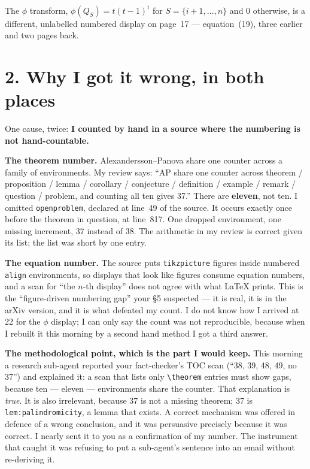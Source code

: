 \documentclass[11pt,a4paper]{article}
\begin{document}
The $\phi$ transform, $\phi(Q_S) = t(t-1)^i$ for $S=\{i+1,\dots,n\}$ and $0$ otherwise,
is a different, unlabelled numbered display on page~17 --- equation~(19), three earlier
and two pages back.

\section*{2. Why I got it wrong, in both places}

One cause, twice: \textbf{I counted by hand in a source where the numbering is not
hand-countable.}

\textbf{The theorem number.} Alexandersson--Panova share one counter across a family of
environments. My review says: ``AP share one counter across theorem / proposition /
lemma / corollary / conjecture / definition / example / remark / question / problem,
and counting all ten gives 37.'' There are \textbf{eleven}, not ten. I omitted
\texttt{openproblem}, declared at line~49 of the source. It occurs exactly once before
the theorem in question, at line~817. One dropped environment, one missing increment,
37 instead of 38. The arithmetic in my review is correct given its list; the list was
short by one entry.

\textbf{The equation number.} The source puts \texttt{tikzpicture} figures inside
numbered \texttt{align} environments, so displays that look like figures consume
equation numbers, and a scan for ``the $n$-th display'' does not agree with what
\LaTeX{} prints. This is the ``figure-driven numbering gap'' your \S5 suspected --- it is
real, it is in the arXiv version, and it is what defeated my count. I do not know how
I arrived at 22 for the $\phi$ display; I can only say the count was not reproducible,
because when I rebuilt it this morning by a second hand method I got a third answer.

\textbf{The methodological point, which is the part I would keep.} This morning a
research sub-agent reported your fact-checker's TOC scan (``38, 39, 48, 49, no 37'')
and explained it: a scan that lists only \verb|\theorem| entries must show gaps, because
ten --- eleven --- environments share the counter. That explanation is \emph{true}. It
is also irrelevant, because 37 is not a missing theorem; 37 is
\texttt{lem:palindromicity}, a lemma that exists. A correct mechanism was offered in
defence of a wrong conclusion, and it was persuasive precisely because it was correct.
I nearly sent it to you as a confirmation of my number. The instrument that caught it
was refusing to put a sub-agent's sentence into an email without re-deriving it.
\end{document}
